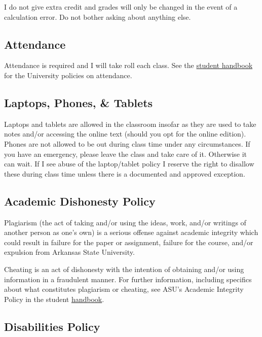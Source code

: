 \documentclass[11pt,]{article}
\begin{document}
I do not give extra credit and grades will only be changed in the event
of a calculation error. Do not bother asking about anything else.

\hypertarget{attendance}{%
\subsection{Attendance}\label{attendance}}

Attendance is required and I will take roll each class. See the
\href{http://www.astate.edu/a/student-conduct/student-standards/handbook-home.dot}{student
handbook} for the University policies on attendance.

\hypertarget{laptops-phones-tablets}{%
\subsection{Laptops, Phones, \& Tablets}\label{laptops-phones-tablets}}

Laptops and tablets are allowed in the classroom insofar as they are
used to take notes and/or accessing the online text (should you opt for
the online edition). Phones are not allowed to be out during class time
under any circumstances. If you have an emergency, please leave the
class and take care of it. Otherwise it can wait. If I see abuse of the
laptop/tablet policy I reserve the right to disallow these during class
time unless there is a documented and approved exception.

\hypertarget{academic-dishonesty-policy}{%
\subsection{Academic Dishonesty
Policy}\label{academic-dishonesty-policy}}

Plagiarism (the act of taking and/or using the ideas, work, and/or
writings of another person as one's own) is a serious offense against
academic integrity which could result in failure for the paper or
assignment, failure for the course, and/or expulsion from Arkansas State
University.

Cheating is an act of dishonesty with the intention of obtaining and/or
using information in a fraudulent manner. For further information,
including specifics about what constitutes plagiarism or cheating, see
ASU's Academic Integrity Policy in the student
\href{https://www.astate.edu/a/student-conduct/student-standards/handbook-home.dot}{handbook}.

\hypertarget{disabilities-policy}{%
\subsection{Disabilities Policy}\label{disabilities-policy}}
\end{document}
